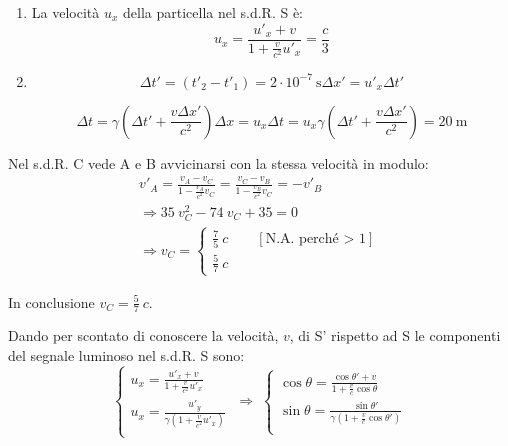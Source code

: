 \documentclass[12pt,twoside,a4]{article}
\begin{document}
\newpage
\begin{solution}
\vspace{-25pt}
\begin{enumerate}[label=(\textit{\roman*})]
 \item La velocità $u_x$ della particella nel s.d.R. S è:
 \begin{equation*}
     u_x = \frac{u'_x + v}{1 + \frac{v}{c^2}u'_x} = \frac{c}{3} 
 \end{equation*}
 
 \item \begin{equation*}
     \Delta t'= (t'_2 -t'_1) = 2 \cdot 10^{-7} \ \mathrm{s}     \Delta x'= u'_x \Delta t'  
 \end{equation*}
 
 \begin{equation*}
     \Delta t = \gamma \left(\Delta t'+\frac{v \Delta x'}{c^2} \right)    \Delta x = u_x \Delta t = u_x \gamma \left(\Delta t'+\frac{v \Delta x'}{c^2}\right) = 20 \ \mathrm{m} 
 \end{equation*}
 \end{enumerate}
\end{solution}
\begin{solution}
	Nel s.d.R. C vede A e B avvicinarsi con la stessa velocità in modulo: 
\begin{gather} 
    v'_A = \frac{v_A - v_C}{1-\frac{v_A}{c^2} v_C} = \frac{v_C - v_B}{1-\frac{v_B}{c^2} v_C} = - v'_B \\
    \Rightarrow  35 \ v^2_C - 74 \ v_C +35 = 0  \\  \Rightarrow   v_C = \begin{cases} 
    \frac{7}{5} \ c  \qquad [\text{N.A. perché > 1}] \\[1em]
    \frac{5}{7} \ c
    \end{cases} 
\end{gather}
 
 In conclusione $v_C = \frac{5}{7} \ c$.
\end{solution}

\begin{solution}
	Dando per scontato di conoscere la velocità, $v$, di S' rispetto ad S le componenti del segnale luminoso nel s.d.R. S sono: 
 \begin{equation*}
     \begin{cases} 
     u_x = \frac{u'_x + v}{1+\frac{v}{c^2} u'_x}\\
     u_x = \frac{u'_y}{\gamma \left(1+\frac{v}{c^2} u'_x \right)}\\ 
     \end{cases}
       \;  \Rightarrow  \; 
     \begin{cases} 
     \cos{\theta} = \frac{\cos{\theta'} + v}{1+\frac{v}{c} \cos{\theta}}\\
     \sin{\theta} = \frac{\sin{\theta'}}{\gamma \left(1+\frac{v}{c} \cos{\theta'} \right)}\\ 
     \end{cases} 
 \end{equation*}
\end{solution}
\end{document}
